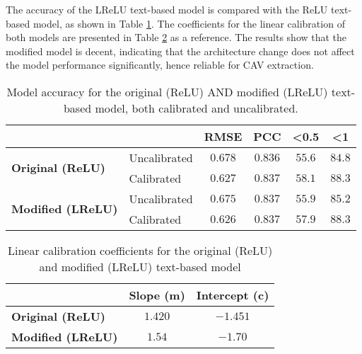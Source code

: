 The accuracy of the LReLU text-based model is compared with the ReLU text-based model, as shown in Table \ref{tab:model_accuracy_lrelu}. The coefficients for the linear calibration of both models are presented in Table \ref{tab:linear_regression_coefficients_lrelu} as a reference. The results show that the modified model is decent, indicating that the architecture change does not affect the model performance significantly, hence reliable for CAV extraction.

\begin{table}[H]
    \centering
    \begin{tabular}{|l|l|c|c|c|c|}
        \hline
        \multicolumn{2}{|l|}{\textbf{}} & \textbf{RMSE} & \textbf{PCC} & \textbf{\textless 0.5} & \textbf{\textless 1}          \\ \hline
        \multirow{2}{*}{\textbf{Original (ReLU)}}
                                        & Uncalibrated  & $0.678$      & $0.836$                & $55.6$               & $84.8$ \\ \cline{2-6}
                                        & Calibrated    & $0.627$      & $0.837$                & $58.1$               & $88.3$ \\ \hline
        \multirow{2}{*}{\textbf{Modified (LReLU)}}
                                        & Uncalibrated  & $0.675$      & $0.837$                & $55.9$               & $85.2$ \\ \cline{2-6}
                                        & Calibrated    & $0.626$      & $0.837$                & $57.9$               & $88.3$ \\ \hline
    \end{tabular}
    \caption{Model accuracy for the original (ReLU) AND modified (LReLU) text-based model, both calibrated and uncalibrated.}
    \label{tab:model_accuracy_lrelu}
\end{table}


\begin{table}[H]
    \centering
    \begin{tabular}{|l|c|c|}
        \hline
        \textbf{}                 & \textbf{Slope (m)} & \textbf{Intercept (c)} \\ \hline
        \textbf{Original (ReLU)}  & $1.420$            & $-1.451$               \\ \hline
        \textbf{Modified (LReLU)} & $1.54$             & $-1.70$                \\ \hline
    \end{tabular}
    \caption{Linear calibration coefficients for the original (ReLU) and modified (LReLU) text-based model}
    \label{tab:linear_regression_coefficients_lrelu}
\end{table}

